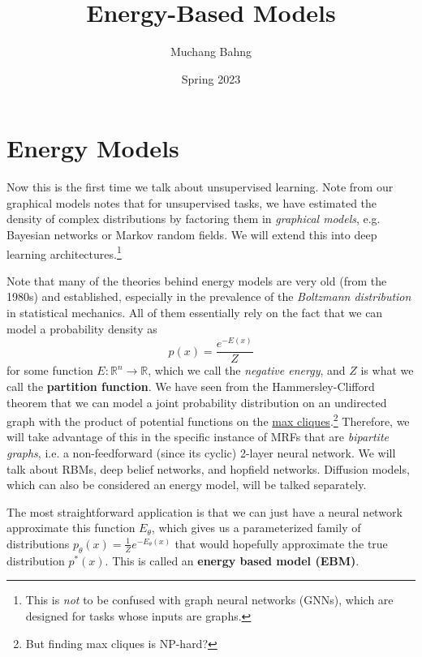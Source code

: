 \documentclass{article}
\begin{document}

\title{Energy-Based Models}
\author{Muchang Bahng}
\date{Spring 2023}

\maketitle
\tableofcontents
\pagebreak 




\section{Energy Models} 

  Now this is the first time we talk about unsupervised learning. Note from our graphical models notes that for unsupervised tasks, we have estimated the density of complex distributions by factoring them in \textit{graphical models}, e.g. Bayesian networks or Markov random fields. We will extend this into deep learning architectures.\footnote{This is \textit{not} to be confused with graph neural networks (GNNs), which are designed for tasks whose inputs are graphs.} 

  Note that many of the theories behind energy models are very old (from the 1980s) and established, especially in the prevalence of the \textit{Boltzmann distribution} in statistical mechanics. All of them essentially rely on the fact that we can model a probability density as 
  \begin{equation}
    p(x) = \frac{e^{-E(x)}}{Z}
  \end{equation}
  for some function $E: \mathbb{R}^n \rightarrow \mathbb{R}$, which we call the \textit{negative energy}, and $Z$ is what we call the \textbf{partition function}. We have seen from the Hammersley-Clifford theorem that we can model a joint probability distribution on an undirected graph with the product of potential functions on the \hyperref[algo-max-clique-np-hard]{max cliques}.\footnote{But finding max cliques is NP-hard?} Therefore, we will take advantage of this in the specific instance of MRFs that are \textit{bipartite graphs}, i.e. a non-feedforward (since its cyclic) 2-layer neural network. We will talk about RBMs, deep belief networks, and hopfield networks. Diffusion models, which can also be considered an energy model, will be talked separately. 

  The most straightforward application is that we can just have a neural network approximate this function $E_\theta$, which gives us a parameterized family of distributions $p_\theta (x) = \frac{1}{Z} e^{-E_\theta (x)}$ that would hopefully approximate the true distribution $p^\ast (x)$. This is called an \textbf{energy based model (EBM)}. 
\end{document}

